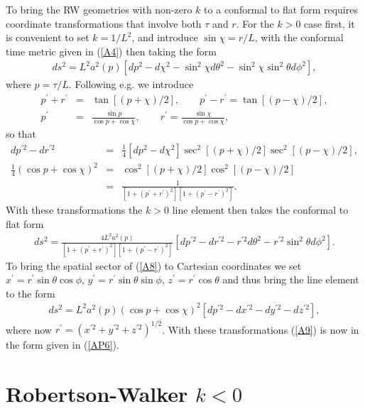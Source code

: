 To bring the RW geometries with non-zero $k$ to a conformal to flat form requires coordinate transformations that involve both $\tau$ and $r$. For the $k>0$ case first, it is convenient to set $k=1/L^2$, and introduce $\sin \chi=r/L$, with the conformal time metric given in (\ref{A4}) then taking the form
%
\begin{eqnarray}
ds^2=L^2a^2(p)\left[dp^2-d\chi^2 -\sin^2\chi d\theta^2-\sin^2\chi \sin^2\theta d\phi^2\right],
\label{A5}
\end{eqnarray}
%
where $p=\tau/L$. Following e.g. \cite{mannheim_2012} we introduce
%
\begin{eqnarray}
p^{\prime}+r^{\prime}&=&\tan[(p+\chi)/2],\qquad p^{\prime}-r^{\prime}=\tan[(p-\chi)/2],
\nonumber\\
p^{\prime}&=&\frac{\sin p}{\cos p+\cos \chi},\qquad r^{\prime}=\frac{\sin \chi}{\cos p+\cos \chi},
\label{A6}
\end{eqnarray}
%
so that
%
\begin{eqnarray}
dp^{\prime 2}-dr^{\prime 2}&=&\frac{1}{4}[dp^2-d\chi^2]\sec^2[(p+\chi)/2]\sec^2[(p-\chi)/2],
\\
\frac{1}{4}(\cos p +\cos \chi)^2&=&\cos^2[(p+\chi)/2]\cos^2[(p-\chi)/2]
\nonumber\\
&=&\frac{1}{[1+(p^{\prime}+r^{\prime})^2][1+(p^{\prime}-r^{\prime})^2]}.
\label{A7}
\end{eqnarray}
%
With these transformations the $k>0$ line element then takes the conformal to flat form
%
\begin{eqnarray}
ds^2=\frac{4L^2a^2(p)}{[1+(p^{\prime}+r^{\prime})^2][1+(p^{\prime}-r^{\prime})^2]}\left[dp^{\prime 2}-dr^{\prime 2} -r^{\prime 2}d\theta^2-r^{\prime 2} \sin^2\theta d\phi^2\right].
\label{A8}
\end{eqnarray}
%
To bring the spatial sector  of (\ref{A8}) to Cartesian coordinates we set  $x^{\prime}=r^{\prime}\sin\theta\cos\phi$, $y^{\prime}=r^{\prime}\sin\theta\sin\phi$, $z^{\prime}=r^{\prime}\cos\theta$ and thus bring the line element to the form  
%
\begin{eqnarray}
ds^2=L^2a^2(p)(\cos p+\cos \chi)^2\left[dp^{\prime 2}-dx^{\prime 2} -dy^{\prime 2} -dz^{\prime 2} \right],
\label{A9}
\end{eqnarray}
%
where now $r^{\prime}=(x^{\prime 2}+ y^{\prime 2}+z^{\prime 2})^{1/2}$. With these transformations (\ref{A9}) is now in the form given in (\ref{AP6}).

\section{Robertson-Walker $k<0$}
\label{abs:rw_kgt0}


